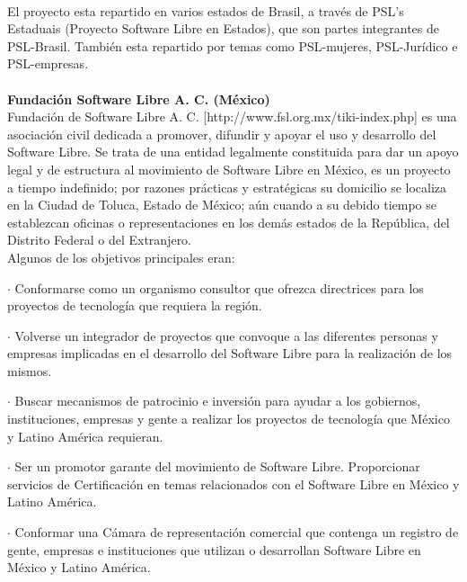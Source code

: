 \documentclass{book}
\begin{document}
\\
El proyecto esta repartido en varios estados de Brasil, a través de PSL's Estaduais (Proyecto Software Libre en Estados), que son partes integrantes de PSL-Brasil. También esta repartido por temas como PSL-mujeres, PSL-Jurídico e PSL-empresas.
\\
\\
{\bf Fundación Software Libre A. C. (México)}
\\
Fundación de Software Libre A. C. [http://www.fsl.org.mx/tiki-index.php] es una asociación civil dedicada a promover, difundir y apoyar el uso y desarrollo del Software Libre. Se trata de una entidad legalmente constituida para dar un apoyo legal y de estructura al movimiento de Software Libre en México, es un proyecto a tiempo indefinido; por razones prácticas y estratégicas su domicilio se localiza en la Ciudad de Toluca, Estado de México; aún cuando a su debido tiempo se establezcan oficinas o representaciones en los demás estados de la República, del Distrito Federal o del Extranjero.
\\
Algunos de los objetivos principales eran:

\begin{description}
\item $\cdot$ Conformarse como un organismo consultor que ofrezca directrices para los proyectos de tecnología que requiera la región.
\item $\cdot$ Volverse un integrador de proyectos que convoque a las diferentes personas y empresas implicadas en el desarrollo del Software Libre para la realización de los mismos.
\item $\cdot$ Buscar mecanismos de patrocinio e inversión para ayudar a los gobiernos, instituciones, empresas y gente a realizar los proyectos de tecnología que México y Latino América requieran.
\item $\cdot$ Ser un promotor garante del movimiento de Software Libre. Proporcionar servicios de Certificación en temas relacionados con el Software Libre en México y Latino América.
\item $\cdot$ Conformar una Cámara de representación comercial que contenga un registro de gente, empresas e instituciones que utilizan o desarrollan Software Libre en México y Latino América.
\end{description}
\end{document}
